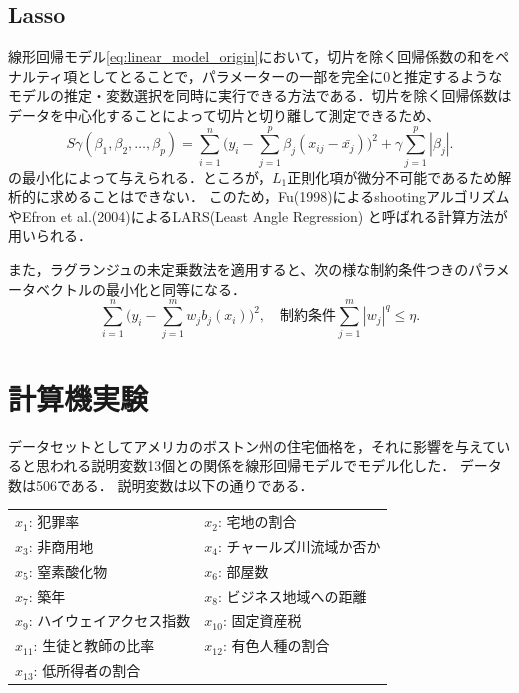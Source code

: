 \documentclass[a4paper,twocolumn]{ujarticle} %
\begin{document}
\subsection{Lasso}
線形回帰モデル\eqref{eq:linear_model_origin}において，切片を除く回帰係数の和をペナルティ項としてとることで，パラメーターの一部を完全に0と推定するようなモデルの推定・変数選択を同時に実行できる方法である．切片を除く回帰係数はデータを中心化することによって切片と切り離して測定できるため、
\begin{equation}
        S\gamma(\beta_1, \beta_2, \dots , \beta_p) = \sum_{i=1}^{n} \bigl(
        	y_i - \sum_{j=1}^{p} \beta_j(x_{ij} - \bar{x_j})
        \bigr)^2 + \gamma \sum_{j=1}^{p}|\beta_j|.
\end{equation}
の最小化によって与えられる．ところが，$L_1$正則化項が微分不可能であるため解析的に求めることはできない．
このため，Fu(1998)によるshootingアルゴリズムやEfron et al.(2004)によるLARS(Least Angle Regression) と呼ばれる計算方法が用いられる．

また，ラグランジュの未定乗数法を適用すると、次の様な制約条件つきのパラメータベクトルの最小化と同等になる．
\begin{equation}
	\sum_{i=1}^{n}\bigl(
		y_i - \sum_{j=1}^{m} w_j b_j(x_i)
	\bigr)^2, \quad 制約条件 \sum_{j=1}^{m} |w_j|^q \leq \eta.
\end{equation}
\section{計算機実験}
データセットとしてアメリカのボストン州の住宅価格を，それに影響を与えていると思われる説明変数13個との関係を線形回帰モデルでモデル化した．
データ数は506である．
説明変数は以下の通りである．

\begin{table}[htb]
	\begin{tabular}{ll}
	$x_1$: 犯罪率  & $x_2$: 宅地の割合\\
	$x_3$: 非商用地 &  $x_4$: チャールズ川流域か否か\\
	$x_5$: 窒素酸化物 &  $x_6$: 部屋数\\
	$x_7$: 築年 &  $x_8$: ビジネス地域への距離\\
	$x_9$: ハイウェイアクセス指数 &  $x_{10}$: 固定資産税\\
	$x_{11}$: 生徒と教師の比率 &  $x_{12}$: 有色人種の割合\\
	$x_{13}$: 低所得者の割合\\
	\end{tabular}
\end{table}
\end{document}
